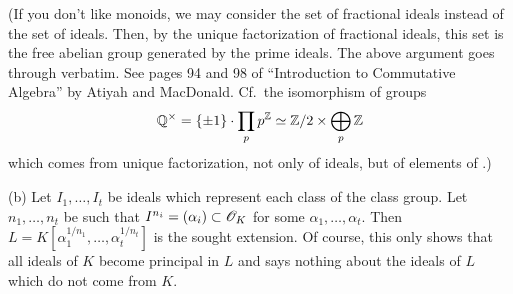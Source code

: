 \documentclass[10pt,a4paper,reqno]{amsart}
\begin{document}
(If you don't like monoids, we may consider the set of fractional ideals
instead of the set of ideals. Then, by the unique factorization of fractional
ideals, this set is the free abelian group generated by the prime ideals. The
above argument goes through verbatim. See pages 94 and 98 of ``Introduction to
Commutative Algebra'' by Atiyah and MacDonald. Cf.~the isomorphism of groups
\[\mathbb{Q}^\times = \{\pm 1\}\cdot \prod_{p} p^{\mathbb{Z}} \simeq \mathbb{Z}/2 \times \bigoplus_{p}
\mathbb{Z}\] which comes from unique factorization, not only of ideals, but of elements
of \Z.)

(b) Let $I_1,\dots,I_t$ be ideals which represent each class of the class
group. Let $n_1,\dots,n_t$ be such that $I^{n_i} = (\alpha_i) \subset \mathscr{O}_K$ for
some $\alpha_1,\dots,\alpha_t$. Then $L =
K[\alpha_1^{1/n_1},\dots,\alpha_t^{1/n_t}]$ is the sought extension. Of
course, this only shows that all ideals of $K$ become principal in $L$ and says
nothing about the ideals of $L$ which do not come from $K$.
\end{document}
